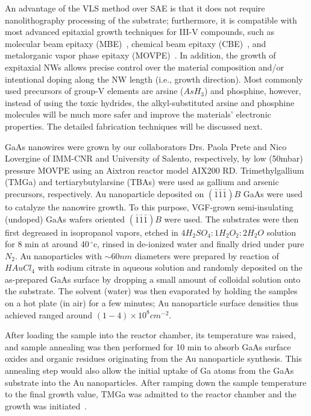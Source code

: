 An advantage of the VLS method over SAE is that it does not require
nanolithography processing of the substrate; furthermore, it is compatible with
most advanced epitaxial growth techniques for III-V compounds, such as
molecular beam epitaxy (MBE)~\cite{Zhou:2009cg,colombo2008ga}, chemical beam
epitaxy (CBE)~\cite{ercolani2009inas}, and metalorganic vapor phase epitaxy
(MOVPE)~\cite{Noborisaka:2005hh,paiano2006size}. In addition, the growth of
expitaxial NWs allows precise control over the material composition and/or
intentional doping along the NW length (i.e., growth direction). Most commonly
used precursors of group-V elements are arsine ($AsH_3$) and phosphine,
however, instead of using the toxic hydrides, the alkyl-substituted arsine and
phosphine molecules will be much more safer and improve the materials'
electronic properties. The detailed fabrication techniques will be discussed
next.

GaAs nanowires were grown by our collaborators Drs. Paola Prete and Nico
Lovergine of IMM-CNR and University of Salento, respectively, by low (50mbar)
pressure MOVPE using an Aixtron reactor model AIX200 RD. Trimethylgallium
(TMGa) and tertiarybutylarsine (TBAs) were used as gallium and arsenic
precursors, respectively. Au nanoparticle deposited on
$(\bar{1}\bar{1}\bar{1})B$ GaAs were used to catalyze the nanowire growth. To
this purpose, VGF-grown semi-insulating (undoped) GaAs wafers oriented
$(\bar{1}\bar{1}\bar{1})B$ were used. The substrates were then first degreased
in isopropanol vapors, etched in $4H_2SO_4:1H_2O_2:2H_2O$ solution for 8 min at
around $40\,^{\circ}\mathrm{c}$, rinsed in de-ionized water and finally dried
under pure $N_2$. Au nanoparticles with $\sim 60 nm$ diameters were prepared by
reaction of $HAuCl_4$ with sodium citrate in aqueous solution and randomly
deposited on the as-prepared GaAs surface by dropping a small amount of
colloidal solution onto the substrate. The solvent (water) was then evaporated
by holding the samples on a hot plate (in air) for a few minutes; Au
nanoparticle surface densities thus achieved ranged around
$(1-4)\times{10}^8{cm}^{-2}$.

After loading the sample into the reactor chamber, its temperature was raised,
and sample annealing was then performed for 10 min to absorb GaAs surface
oxides and organic residues originating from the Au nanoparticle synthesis.
This annealing step would also allow the initial uptake of Ga atoms from the
GaAs substrate into the Au nanoparticles. After ramping down the sample
temperature to the final growth value, TMGa was admitted to the reactor chamber
and the growth was initiated~\cite{paiano2006size}.

